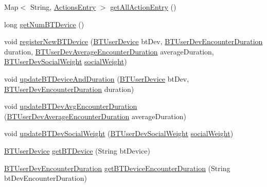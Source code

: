 \begin{DoxyCompactItemize}
Map$<$ String, \hyperlink{classcs_1_1nsense_1_1accelerometer_1_1_actions_entry}{Actions\-Entry} $>$ \hyperlink{classcs_1_1nsense_1_1db_1_1_n_sense_data_source_a02b03c4057dd5b0b6f60716860d5ed8f}{get\-All\-Action\-Entry} ()
\item 
long \hyperlink{classcs_1_1nsense_1_1db_1_1_n_sense_data_source_a9aac678b0a1757c6202c2a0ed9e85297}{get\-Num\-B\-T\-Device} ()
\item 
void \hyperlink{classcs_1_1nsense_1_1db_1_1_n_sense_data_source_aad7cc87eaf859d87b8ff60745c2d97ee}{register\-New\-B\-T\-Device} (\hyperlink{classcs_1_1nsense_1_1bluetooth_1_1_b_t_user_device}{B\-T\-User\-Device} bt\-Dev, \hyperlink{classcs_1_1nsense_1_1bluetooth_1_1_b_t_user_dev_encounter_duration}{B\-T\-User\-Dev\-Encounter\-Duration} duration, \hyperlink{classcs_1_1nsense_1_1bluetooth_1_1_b_t_user_dev_average_encounter_duration}{B\-T\-User\-Dev\-Average\-Encounter\-Duration} average\-Duration, \hyperlink{classcs_1_1nsense_1_1bluetooth_1_1_b_t_user_dev_social_weight}{B\-T\-User\-Dev\-Social\-Weight} \hyperlink{classcs_1_1nsense_1_1bluetooth_1_1_bluetooth_core_1_1social_weight}{social\-Weight})
\item 
void \hyperlink{classcs_1_1nsense_1_1db_1_1_n_sense_data_source_ac87ff1fda6f786f26cd0225a22085d8c}{update\-B\-T\-Device\-And\-Duration} (\hyperlink{classcs_1_1nsense_1_1bluetooth_1_1_b_t_user_device}{B\-T\-User\-Device} bt\-Dev, \hyperlink{classcs_1_1nsense_1_1bluetooth_1_1_b_t_user_dev_encounter_duration}{B\-T\-User\-Dev\-Encounter\-Duration} duration)
\item 
void \hyperlink{classcs_1_1nsense_1_1db_1_1_n_sense_data_source_a5f46751d272478c6893cec03d5f7968d}{update\-B\-T\-Dev\-Avg\-Encounter\-Duration} (\hyperlink{classcs_1_1nsense_1_1bluetooth_1_1_b_t_user_dev_average_encounter_duration}{B\-T\-User\-Dev\-Average\-Encounter\-Duration} average\-Duration)
\item 
void \hyperlink{classcs_1_1nsense_1_1db_1_1_n_sense_data_source_abd933d2504530b24259b8f66dcf3af4d}{update\-B\-T\-Dev\-Social\-Weight} (\hyperlink{classcs_1_1nsense_1_1bluetooth_1_1_b_t_user_dev_social_weight}{B\-T\-User\-Dev\-Social\-Weight} \hyperlink{classcs_1_1nsense_1_1bluetooth_1_1_bluetooth_core_1_1social_weight}{social\-Weight})
\item 
\hyperlink{classcs_1_1nsense_1_1bluetooth_1_1_b_t_user_device}{B\-T\-User\-Device} \hyperlink{classcs_1_1nsense_1_1db_1_1_n_sense_data_source_ae6c6ba8c32c0db1f2a43c32a50cf20d8}{get\-B\-T\-Device} (String bt\-Device)
\item 
\hyperlink{classcs_1_1nsense_1_1bluetooth_1_1_b_t_user_dev_encounter_duration}{B\-T\-User\-Dev\-Encounter\-Duration} \hyperlink{classcs_1_1nsense_1_1db_1_1_n_sense_data_source_ae5263d50c5a5da4abeb035a7f2314870}{get\-B\-T\-Device\-Encounter\-Duration} (String bt\-Dev\-Encounter\-Duration)

\end{DoxyCompactItemize}
